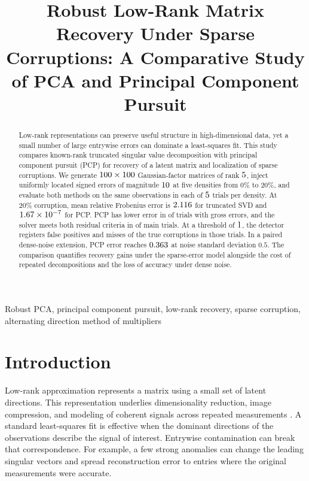 \documentclass[conference]{IEEEtran}
\title{Robust Low-Rank Matrix Recovery Under Sparse Corruptions: A Comparative Study of PCA and Principal Component Pursuit}
\author{\IEEEauthorblockN{Aashish M}
\IEEEauthorblockA{EP23BT005, Engineering Physics\\{IIT Dharwad}\\{ep23bt005@iitdh.ac.in}}}
\begin{document}
\maketitle

\begin{abstract}
Low-rank representations can preserve useful structure in high-dimensional data, yet a small number of large entrywise errors can dominate a least-squares fit. This study compares known-rank truncated singular value decomposition with principal component pursuit (PCP) for recovery of a latent matrix and localization of sparse corruptions. We generate $100\times100$ Gaussian-factor matrices of rank $5$, inject uniformly located signed errors of magnitude $10$ at five densities from 0\% to 20\%, and evaluate both methods on the same observations in each of $5$ trials per density. At 20\% corruption, mean relative Frobenius error is $2.116$ for truncated SVD and $1.67\times10^{-7}$ for PCP. PCP has lower error in \CorruptWins{} of \CorruptTrialCount{} trials with gross errors, and the solver meets both residual criteria in \MainConverged{} of \MainTrialCount{} main trials. At a threshold of $1$, the detector registers \CorruptFalsePos{} false positives and misses \CorruptFalseNeg{} of the \CorruptTotalPos{} true corruptions in those trials. In a paired dense-noise extension, PCP error reaches $0.363$ at noise standard deviation $0.5$. The comparison quantifies recovery gains under the sparse-error model alongside the cost of repeated decompositions and the loss of accuracy under dense noise.
\end{abstract}

\begin{IEEEkeywords}
Robust PCA, principal component pursuit, low-rank recovery, sparse corruption, alternating direction method of multipliers
\end{IEEEkeywords}

\section{Introduction}
Low-rank approximation represents a matrix using a small set of latent directions. This representation underlies dimensionality reduction, image compression, and modeling of coherent signals across repeated measurements \cite{jolliffe2002}. A standard least-squares fit is effective when the dominant directions of the observations describe the signal of interest. Entrywise contamination can break that correspondence. For example, a few strong anomalies can change the leading singular vectors and spread reconstruction error to entries where the original measurements were accurate.
\end{document}

